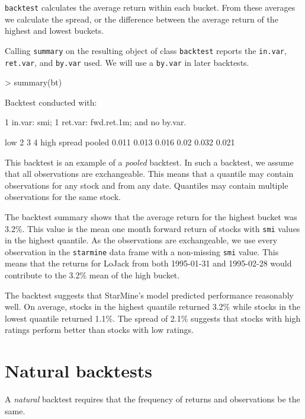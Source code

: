 \documentclass[a4paper]{report}
\begin{document}
\begin{article}
\texttt{backtest} calculates the average return within each bucket.
From these averages we calculate the spread, or the difference between
the average return of the highest and lowest buckets.

Calling \texttt{summary} on the resulting object of class
\texttt{backtest} reports the \texttt{in.var}, \texttt{ret.var}, and
\texttt{by.var} used.  We will use a \texttt{by.var} in later
backtests.

\begin{Schunk}
\begin{Sinput}
> summary(bt)
\end{Sinput}
\begin{Soutput}
Backtest conducted with:

1 in.var: smi;
1 ret.var: fwd.ret.1m;
and no by.var.

         low     2     3    4  high spread
pooled 0.011 0.013 0.016 0.02 0.032  0.021
\end{Soutput}
\end{Schunk}

This backtest is an example of a \emph{pooled} backtest. In such a
backtest, we assume that all observations are exchangeable.  This
means that a quantile may contain observations for any stock and from
any date.  Quantiles may contain multiple observations for the same
stock.

The backtest summary shows that the average return for the highest
bucket was 3.2\%.  This value is the mean one month forward return of
stocks with \texttt{smi} values in the highest quantile.  As the
observations are exchangeable, we use every observation in the
\texttt{starmine} data frame with a non-missing \texttt{smi} value.
This means that the returns for LoJack from both 1995-01-31 and
1995-02-28 would contribute to the 3.2\% mean of the high bucket.

The backtest suggests that StarMine's model predicted performance
reasonably well.  On average, stocks in the highest quantile returned
3.2\% while stocks in the lowest quantile returned 1.1\%.  The spread
of 2.1\% suggests that stocks with high ratings perform better than
stocks with low ratings.

\section*{Natural backtests}

A \emph{natural} backtest requires that the frequency of returns and
observations be the same.  


\end{article}
\end{document}
